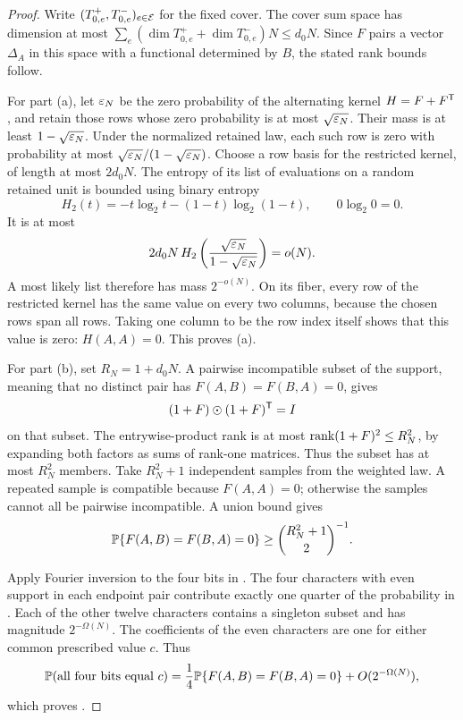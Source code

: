 \begin{proof}
Write \((T_{0,e}^+,T_{0,e}^-)_{e\in\mathcal E}\) for the fixed cover.
The cover sum space has dimension at most
\(\sum_e(\dim T_{0,e}^++\dim T_{0,e}^-)N\le d_0N\).
Since \(F\) pairs a vector \(\Delta_A\) in this space with a
functional determined by \(B\), the stated rank bounds follow.

For part (a), let \(\varepsilon_N\) be the zero probability of the
alternating kernel \(H=F+F^{\mathsf T}\), and retain those rows whose
zero probability is at most \(\sqrt{\varepsilon_N}\).  Their mass is
at least \(1-\sqrt{\varepsilon_N}\).  Under the normalized retained
law, each such row is zero with probability at most
\(\sqrt{\varepsilon_N}/(1-\sqrt{\varepsilon_N})\).
Choose a row basis for the restricted kernel, of length at
most \(2d_0N\).  The entropy of its list of evaluations on a
random retained unit is bounded using binary entropy
\[
 H_2(t)=-t\log_2t-(1-t)\log_2(1-t),\qquad 0\log_2 0=0.
\]
It is at most
\[
 2d_0N\,
 H_2\left(\frac{\sqrt{\varepsilon_N}}{1-\sqrt{\varepsilon_N}}\right)=o(N).
 \]
A most likely list therefore has mass \(2^{-o(N)}\).
On its fiber, every row of the restricted kernel has the
same value on every two columns, because the chosen rows
span all rows.  Taking one column to be the row index itself
shows that this value is zero: \(H(A,A)=0\).  This proves (a).

For part (b), set \(R_N=1+d_0N\).  A pairwise incompatible
subset of the support, meaning that no distinct pair has
\(F(A,B)=F(B,A)=0\), gives
\[
 (1+F)\mathbin{\odot}(1+F)^{\mathsf T}=I
 \]
on that subset.  The entrywise-product rank is at most
\(\operatorname{rank}(1+F)^2\le R_N^2\), by expanding both factors as sums
of rank-one matrices.  Thus the subset has at most \(R_N^2\)
members.  Take \(R_N^2+1\) independent samples from the
weighted law.  A repeated sample is compatible because
\(F(A,A)=0\); otherwise the samples cannot all be pairwise
incompatible.  A union bound gives
\begin{equation}
 \mathbb P\{F(A,B)=F(B,A)=0\}
 \ge \binom{R_N^2+1}{2}^{-1}.
 \label{eq:tiny-polynomial}
\end{equation}

Apply Fourier inversion to the four bits in
.  The four characters with even
support in each endpoint pair contribute exactly
one quarter of the probability in .
Each of the other twelve characters contains a singleton
subset and has magnitude \(2^{-\Omega(N)}\).
The coefficients of the even characters are one for either
common prescribed value \(c\).  Thus
\[
 \mathbb P(\text{all four bits equal }c)
 =\frac14\mathbb P\{F(A,B)=F(B,A)=0\}
   +O(2^{-\Omega(N)}),
 \]
which proves .


\end{proof}
